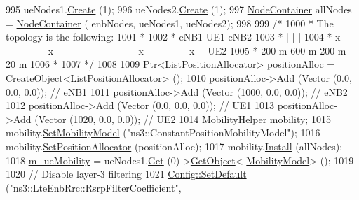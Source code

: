 \begin{DoxyCode}
995   ueNodes1.\hyperlink{classns3_1_1NodeContainer_a787f059e2813e8b951cc6914d11dfe69}{Create} (1);
996   ueNodes2.\hyperlink{classns3_1_1NodeContainer_a787f059e2813e8b951cc6914d11dfe69}{Create} (1);
997   \hyperlink{classns3_1_1NodeContainer}{NodeContainer} allNodes = \hyperlink{classns3_1_1NodeContainer}{NodeContainer} ( enbNodes, ueNodes1, ueNodes2);
998 
999   \textcolor{comment}{/*}
1000 \textcolor{comment}{   * The topology is the following:}
1001 \textcolor{comment}{   *}
1002 \textcolor{comment}{   *  eNB1            UE1                                      eNB2}
1003 \textcolor{comment}{   *    |              |                                         |}
1004 \textcolor{comment}{   *    x ------------ x ------------------------ x ------------ x----UE2}
1005 \textcolor{comment}{   *         200 m               600 m                  200 m      20 m}
1006 \textcolor{comment}{   *}
1007 \textcolor{comment}{   */}
1008 
1009   \hyperlink{classns3_1_1Ptr}{Ptr<ListPositionAllocator>} positionAlloc = CreateObject<ListPositionAllocator> 
      ();
1010   positionAlloc->\hyperlink{classns3_1_1ListPositionAllocator_a460e82f015ac012a73ba0ea0cccb3486}{Add} (Vector (0.0, 0.0, 0.0));   \textcolor{comment}{// eNB1}
1011   positionAlloc->\hyperlink{classns3_1_1ListPositionAllocator_a460e82f015ac012a73ba0ea0cccb3486}{Add} (Vector (1000, 0.0, 0.0)); \textcolor{comment}{// eNB2}
1012   positionAlloc->\hyperlink{classns3_1_1ListPositionAllocator_a460e82f015ac012a73ba0ea0cccb3486}{Add} (Vector (0.0, 0.0, 0.0));  \textcolor{comment}{// UE1}
1013   positionAlloc->\hyperlink{classns3_1_1ListPositionAllocator_a460e82f015ac012a73ba0ea0cccb3486}{Add} (Vector (1020, 0.0, 0.0));  \textcolor{comment}{// UE2}
1014   \hyperlink{classns3_1_1MobilityHelper}{MobilityHelper} mobility;
1015   mobility.\hyperlink{classns3_1_1MobilityHelper_a030275011b6f40682e70534d30280aba}{SetMobilityModel} (\textcolor{stringliteral}{"ns3::ConstantPositionMobilityModel"});
1016   mobility.\hyperlink{classns3_1_1MobilityHelper_ac59d5295076be3cc11021566713a28c5}{SetPositionAllocator} (positionAlloc);
1017   mobility.\hyperlink{classns3_1_1MobilityHelper_a07737960ee95c0777109cf2994dd97ae}{Install} (allNodes);
1018   \hyperlink{classLteFrAreaTestCase_ae2f235fc4d87154ef9f32bc0d92ef2ca}{m\_ueMobility} = ueNodes1.\hyperlink{classns3_1_1NodeContainer_a9ed96e2ecc22e0f5a3d4842eb9bf90bf}{Get} (0)->\hyperlink{classns3_1_1Object_a13e18c00017096c8381eb651d5bd0783}{GetObject}<
      \hyperlink{classns3_1_1MobilityModel}{MobilityModel}> ();
1019 
1020   \textcolor{comment}{// Disable layer-3 filtering}
1021   \hyperlink{group__config_ga2e7882df849d8ba4aaad31c934c40c06}{Config::SetDefault} (\textcolor{stringliteral}{"ns3::LteEnbRrc::RsrpFilterCoefficient"},

\end{DoxyCode}
